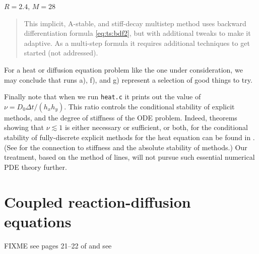 \begin{enumerate}
\hfill $R=2.4$, $M=28$
\begin{quote} This implicit, A-stable, and stiff-decay multistep method \citep{AscherPetzold1998} uses backward differentiation formula \eqref{eq:ts:bdf2}, but with additional tweaks to make it adaptive.  As a multi-step formula it requires additional techniques to get started (not addressed).\end{quote}
\end{enumerate}

For a heat or diffusion equation problem like the one under consideration, we may conclude that runs a), f), and g) represent a selection of good things to try.

Finally note that when we run \texttt{heat.c} it prints out the value of $\nu = D_0 \Delta t / (h_x h_y)$.  This ratio controls the conditional stability of explicit methods, and the degree of stiffness of the ODE problem.  Indeed, theorems showing that $\nu \lesssim 1$ is either necessary or sufficient, or both, for the conditional stability of fully-discrete explicit methods for the heat equation can be found in \citep{MortonMayers2005}.  (See \citep{LeVeque2007} for the connection to stiffness and the absolute stability of methods.)  Our treatment, based on the method of lines, will not pursue such essential numerical PDE theory further.



\section{Coupled reaction-diffusion equations}

FIXME see pages 21--22 of \citep{HundsdorferVerwer2003} and see \citep{Pearson1993}





